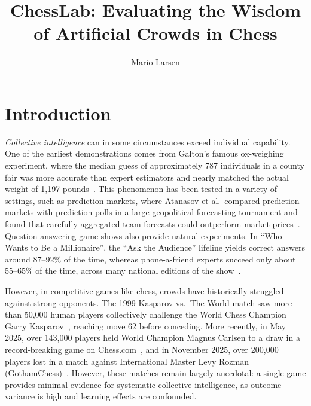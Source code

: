 \documentclass[sigconf]{aamas}
\title[ChessLab: Evaluating Artificial Crowds in Chess]{ChessLab: Evaluating the Wisdom of Artificial Crowds in Chess}
\author{Mario Larsen}
\affiliation{
  \institution{Independent Researcher}
  \city{Paris}
  \country{France}}
\begin{document}

\pagestyle{fancy}
\fancyhead{}


\maketitle


\section{Introduction}

\emph{Collective intelligence} can in some circumstances exceed individual capability.
One of the earliest demonstrations comes from Galton's famous ox-weighing experiment, where the median guess of approximately 787 individuals in a county fair was more accurate than expert estimators and nearly matched the actual weight of 1,197 pounds~\cite{galton1907}.
This phenomenon has been tested in a variety of settings, such as prediction markets, where Atanasov et al.\ compared prediction markets with prediction polls in a large geopolitical forecasting tournament and found that carefully aggregated team forecasts could outperform market prices~\cite{atanasov2017}.
Question-answering game shows also provide natural experiments.
In ``Who Wants to Be a Millionaire'', the ``Ask the Audience'' lifeline yields correct answers around 87--92\% of the time, whereas phone-a-friend experts succeed only about 55--65\% of the time, across many national editions of the show~\cite{surowiecki2004}.

However, in competitive games like chess, crowds have historically struggled against strong opponents.
The 1999 Kasparov vs.\ The World match saw more than 50,000 human players collectively challenge the World Chess Champion Garry Kasparov~\cite{kasparov1999}, reaching move 62 before conceding.
More recently, in May 2025, over 143,000 players held World Champion Magnus Carlsen to a draw in a record-breaking game on Chess.com~\cite{chess2025}, and in November 2025, over 200,000 players lost in a match against International Master Levy Rozman (GothamChess)~\cite{gothamchess2025}.
However, these matches remain largely anecdotal: a single game provides minimal evidence for systematic collective intelligence, as outcome variance is high and learning effects are confounded.
\end{document}

